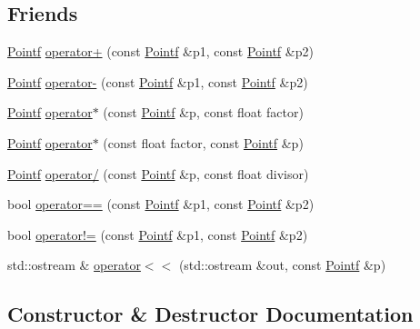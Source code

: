\subsection*{Friends}
\begin{DoxyCompactItemize}
\item 
\hyperlink{classprism_1_1_pointf}{Pointf} \hyperlink{classprism_1_1_pointf_a32b96cc3995453a257c95f1a5048feec}{operator+} (const \hyperlink{classprism_1_1_pointf}{Pointf} \&p1, const \hyperlink{classprism_1_1_pointf}{Pointf} \&p2)
\item 
\hyperlink{classprism_1_1_pointf}{Pointf} \hyperlink{classprism_1_1_pointf_aa38ec65c1fe1ea8738ea87d584ce041b}{operator-\/} (const \hyperlink{classprism_1_1_pointf}{Pointf} \&p1, const \hyperlink{classprism_1_1_pointf}{Pointf} \&p2)
\item 
\hyperlink{classprism_1_1_pointf}{Pointf} \hyperlink{classprism_1_1_pointf_a3c30f12145ef35292b4bda98ffae5ed8}{operator$\ast$} (const \hyperlink{classprism_1_1_pointf}{Pointf} \&p, const float factor)
\item 
\hyperlink{classprism_1_1_pointf}{Pointf} \hyperlink{classprism_1_1_pointf_af430cf92a6674e13f1b99a97f38c400a}{operator$\ast$} (const float factor, const \hyperlink{classprism_1_1_pointf}{Pointf} \&p)
\item 
\hyperlink{classprism_1_1_pointf}{Pointf} \hyperlink{classprism_1_1_pointf_a574af11f980c5b1cfdbfe0c653f53bf2}{operator/} (const \hyperlink{classprism_1_1_pointf}{Pointf} \&p, const float divisor)
\item 
bool \hyperlink{classprism_1_1_pointf_a1459678221b6e093b6e5eedc4f6f52a0}{operator==} (const \hyperlink{classprism_1_1_pointf}{Pointf} \&p1, const \hyperlink{classprism_1_1_pointf}{Pointf} \&p2)
\item 
bool \hyperlink{classprism_1_1_pointf_a15d703b43330fcb10ae27ce17ad1b96d}{operator!=} (const \hyperlink{classprism_1_1_pointf}{Pointf} \&p1, const \hyperlink{classprism_1_1_pointf}{Pointf} \&p2)
\item 
std\+::ostream \& \hyperlink{classprism_1_1_pointf_a2e9f3497d53913f99ea6a76c400f0b58}{operator$<$$<$} (std\+::ostream \&out, const \hyperlink{classprism_1_1_pointf}{Pointf} \&p)
\end{DoxyCompactItemize}


\subsection{Constructor \& Destructor Documentation}
